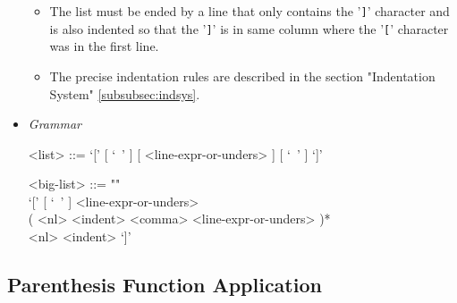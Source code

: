 \documentclass[diploma]{softlab-thesis}
\begin{document}
\begin{itemize}
\begin{itemize}
  \item
  The list must be ended by a line that only contains the '\verb|]|' character
  and is also indented so that the '\verb|]|' is in same column where the
  '\verb|[|' character was in the first line.

  \item
  The precise indentation rules are described in the section
  "Indentation System" \ref{subsubsec:indsys}.
  \end{itemize}

\item \textit{Grammar}
\begin{grammar}
<list> ::= `[' [ `\ ' ] [ <line-expr-or-unders> ] [ `\ ' ] `]'

<big-list> ::= ""\\
`[' [ `\ ' ] <line-expr-or-unders> \\
( <nl> <indent> <comma> <line-expr-or-unders> )* \\
<nl> <indent> `]'
\end{grammar}

\end{itemize}

\newpage
\subsection{Parenthesis Function Application}
\label{subsubsec:parenfuncapp}
\end{document}
